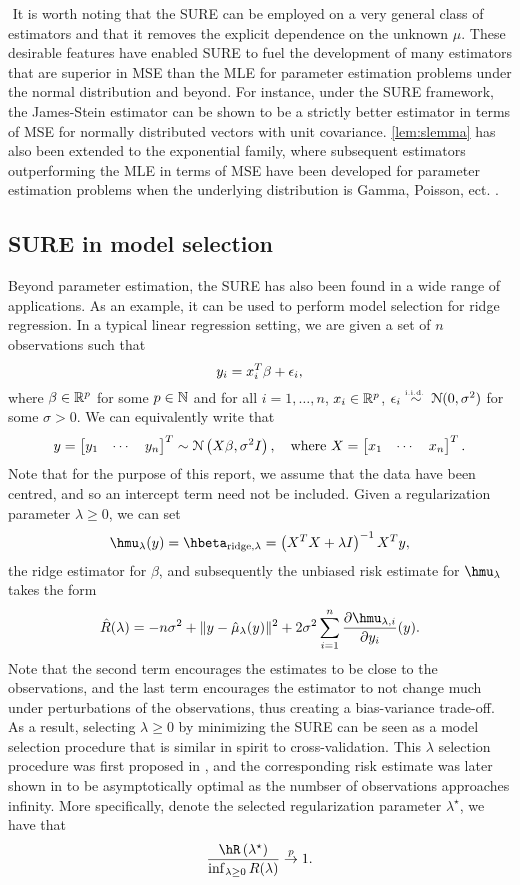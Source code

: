 $ $\newline
It is worth noting that the SURE can be employed on a very general class of estimators and that it removes the explicit dependence on the unknown $\mu$. These desirable features have enabled SURE to fuel the development of many estimators that are superior in MSE than the MLE for parameter estimation problems under the normal distribution and beyond. For instance, under the SURE framework, the James-Stein estimator \citep{james1992estimation} can be shown to be a strictly better estimator in terms of MSE for normally distributed vectors with unit covariance. \cref{lem:slemma} has also been extended to the exponential family, where subsequent estimators outperforming the MLE in terms of MSE have been developed for parameter estimation problems when the underlying distribution is Gamma, Poisson, ect. \citep{hudson1978natural,peng1975simultaneous,tsui1978simultaneous}.

\subsection{SURE in model selection}\label{sec:sure_model_selection}
Beyond parameter estimation, the SURE has also been found in a wide range of applications. As an example, it can be used to perform model selection for ridge regression. In a typical linear regression setting, we are given a set of $n$ observations such that
\[
y_i = x_i^T\beta + \epsilon_i,
\]
where $\beta\in\mathbb{R}^p$ for some $p\in\mathbb{N}$ and for all $i=1,\dots,n$, $x_i\in\mathbb{R}^p$, $\epsilon_i\overset{\textrm{\tiny i.i.d.\ }}{\sim} \mathcal{N}(0,\sigma^2)$ for some $\sigma>0$. We can equivalently write that
\[
y = \begin{bmatrix} y_1 & \cdots & y_n \end{bmatrix}^T \sim \mathcal{N}\left(X\beta, \sigma^2I \right), \quad \text{where } X = \begin{bmatrix} x_1 & \cdots & x_n \end{bmatrix}^T.
\]
Note that for the purpose of this report, we assume that the data have been centred, and so an intercept term need not be included. Given a regularization parameter $\lambda\geq0$, we can set
\[
\hmu_\lambda(y) = \hbeta_{\text{ridge}, \lambda} = \left( X^TX + \lambda I \right)^{-1}X^Ty,
\]
the ridge estimator for $\beta$, and subsequently the unbiased risk estimate for $\hmu_\lambda$ takes the form
\[
\hat{R}(\lambda) = -n\sigma^2 + \| y - \hat{\mu}_\lambda(y) \|^2 + 2\sigma^2\sum_{i=1}^n \frac{\partial \hmu_{\lambda,i}}{\partial y_i}(y).
\]
Note that the second term encourages the estimates to be close to the observations, and the last term encourages the estimator to not change much under perturbations of the observations, thus creating a bias-variance trade-off. As a result, selecting $\lambda\geq0$ by minimizing the SURE can be seen as a model selection procedure that is similar in spirit to cross-validation. This $\lambda$ selection procedure was first proposed in \citet{10.2307/1267380}, and the corresponding risk estimate was later shown in \citet{li1986asymptotic} to be asymptotically optimal as the numbser of observations approaches infinity. More specifically, denote the selected regularization parameter $\lambda^\star$, we have that
\[
\frac{\hR\left(\lambda^\star\right)}{\inf_{\lambda\geq0}R(\lambda)} \convp 1.
\]
